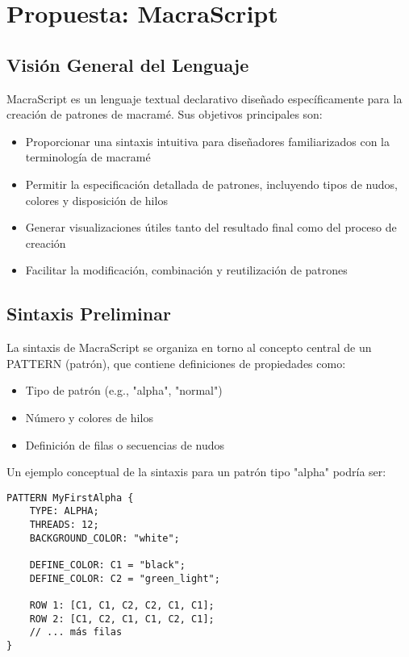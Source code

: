\documentclass[conference]{IEEEtran}
\begin{document}
\section{Propuesta: MacraScript}
\subsection{Visión General del Lenguaje}
MacraScript es un lenguaje textual declarativo diseñado específicamente para la creación de patrones de macramé. Sus objetivos principales son:

\begin{itemize}    \item Proporcionar una sintaxis intuitiva para diseñadores familiarizados con la terminología de macramé
    \item Permitir la especificación detallada de patrones, incluyendo tipos de nudos, colores y disposición de hilos
    \item Generar visualizaciones útiles tanto del resultado final como del proceso de creación
    \item Facilitar la modificación, combinación y reutilización de patrones~\cite{voelter2013}
\end{itemize}

\subsection{Sintaxis Preliminar}
La sintaxis de MacraScript se organiza en torno al concepto central de un PATTERN (patrón), que contiene definiciones de propiedades como:

\begin{itemize}
    \item Tipo de patrón (e.g., "alpha", "normal")
    \item Número y colores de hilos
    \item Definición de filas o secuencias de nudos
\end{itemize}

Un ejemplo conceptual de la sintaxis para un patrón tipo "alpha" podría ser:

\begin{verbatim}
PATTERN MyFirstAlpha {
    TYPE: ALPHA;
    THREADS: 12;
    BACKGROUND_COLOR: "white";

    DEFINE_COLOR: C1 = "black";
    DEFINE_COLOR: C2 = "green_light";
    
    ROW 1: [C1, C1, C2, C2, C1, C1];
    ROW 2: [C1, C2, C1, C1, C2, C1];
    // ... más filas
}
\end{verbatim}
\end{document}
